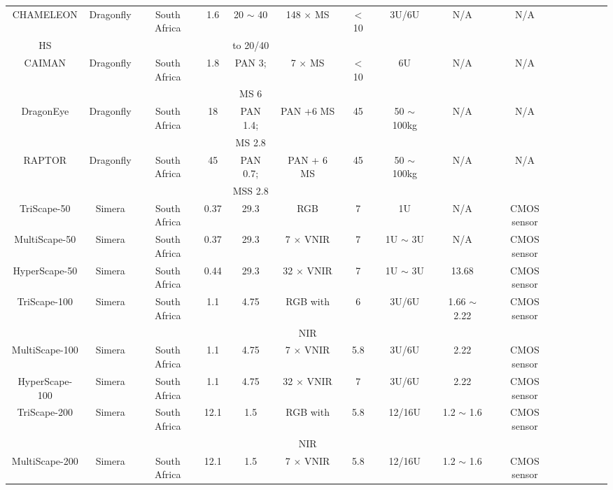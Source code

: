 \documentclass[final,5p,times,sort&compress,twocolumn]{elsarticle}
\begin{document}
\begin{table}
{\begin{tabular}{c c c c c c c c c c c c c c c}
			CHAMELEON & Dragonfly & South Africa & 1.6 & 20 $\sim$ 40 &  148 $\times$ MS & $<$ 10 &  3U/6U & N/A & N/A & \cite{dragonfly2023} \\
			HS& & & & to 20/40 &  & & & & & & & & & \\
			CAIMAN &  Dragonfly & South Africa & 1.8 & PAN 3; &  7 $\times$ MS & $<$ 10 &  6U & N/A & N/A & \cite{dragonfly2023} \\
			& & & & MS 6 &  & & & & & & & & & \\
			DragonEye & Dragonfly & South Africa & 18 & PAN 1.4; &  PAN +6 MS & 45 & 50 $\sim$ 100kg & N/A & N/A & \cite{dragonfly2023}\\
			& & & & MS 2.8 &  & & & & & & & & & \\
			RAPTOR & Dragonfly & South Africa & 45 & PAN 0.7; &  PAN + 6 MS & 45 &  50 $\sim$ 100kg & N/A & N/A & \cite{dragonfly2023} \\
			& & & & MSS 2.8 &  & & & & & & & & & \\
			TriScape-50 & Simera & South Africa & 0.37 & 29.3 & RGB & 7 & 1U & N/A & CMOS   sensor &\cite{casini2020towards, simer2023}\\
			MultiScape-50 & Simera & South Africa & 0.37 & 29.3 &  7 $\times$ VNIR & 7 & 1U $\sim$ 3U & N/A & CMOS sensor & \cite{casini2020towards, simer2023}\\
			HyperScape-50 & Simera & South Africa & 0.44 & 29.3 & 32 $\times$ VNIR & 7 &  1U $\sim$ 3U & 13.68 & CMOS sensor & \cite{casini2020towards, Simera2023}\\
			TriScape-100 & Simera & South Africa & 1.1 & 4.75 &  RGB with & 6 &  3U/6U & 1.66 $\sim$ 2.22 & CMOS  sensor & \cite{casini2020towards, Simera2023}\\
			& & & & &  NIR & & & & & & &  \\
			MultiScape-100 & Simera & South Africa & 1.1 & 4.75 & 7 $\times$ VNIR & 5.8 &  3U/6U & 2.22 & CMOS  sensor  & \cite{casini2020towards,  Simera2023}\\
			HyperScape-100 & Simera & South Africa & 1.1 & 4.75 &  32 $\times$ VNIR & 7 &  3U/6U & 2.22 & CMOS sensor & \cite{casini2020towards, Simera2023}\\
			TriScape-200 & Simera & South Africa & 12.1 & 1.5 & RGB with & 5.8 &12/16U & 1.2 $\sim$ 1.6 & CMOS sensor & \cite{Simera2023}\\
			& & & & &  NIR & & & & & & &  \\
			MultiScape-200 & Simera & South Africa & 12.1 & 1.5 & 7 $\times$ VNIR & 5.8 &  12/16U & 1.2 $\sim$ 1.6 & CMOS sensor  & \cite{Simera2023} \\

\end{tabular}}
\end{table}
\end{document}
